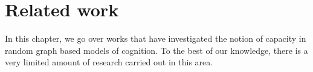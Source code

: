 \chapter{Related work}

In this chapter, we go over works that have investigated the notion of capacity in random graph based models of cognition. To the best of our knowledge, there is a very limited amount of research carried out in this area. 